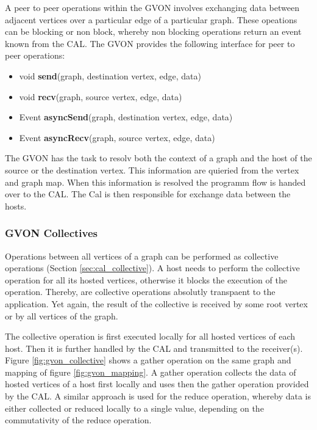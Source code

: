 A peer to peer operations within the GVON involves exchanging data
between adjacent vertices over a particular edge of a particular
graph.  These opeations can be blocking or non block, whereby non
blocking operations return an event known from the CAL.  The GVON
provides the following interface for peer to peer operations:

\begin{itemize}
  \item [] void \textbf{send}(graph, destination vertex, edge, data)
  \item [] void \textbf{recv}(graph, source vertex, edge, data)
  \item [] Event \textbf{asyncSend}(graph, destination vertex, edge, data)
  \item [] Event \textbf{asyncRecv}(graph, source vertex, edge, data)
\end{itemize}

The GVON has the task to resolv both the context of a graph and the
host of the source or the destination vertex. This information are
quieried from the vertex and graph map. When this information is
resolved the programm flow is handed over to the CAL. The Cal is then
responsible for exchange data between the hosts.

\subsubsection*{GVON Collectives}
Operations between all vertices of a graph can be performed as
collective operations (Section \ref{sec:cal_collective}). A host needs
to perform the collective operation for all its hosted vertices,
otherwise it blocks the execution of the operation.  Thereby, are
collective operations absolutly transpaent to the application. Yet
again, the result of the collective is received by some root vertex or
by all vertices of the graph.

The collective operation is first executed locally for all hosted
vertices of each host. Then it is further handled by the CAL and
transmitted to the receiver(s). Figure \ref{fig:gvon_collective} shows
a gather operation on the same graph and mapping of figure
\ref{fig:gvon_mapping}. A gather operation collects the data of hosted
vertices of a host first locally and uses then the gather operation
provided by the CAL. A similar approach is used for the reduce
operation, whereby data is either collected or reduced locally to a
single value, depending on the commutativity of the reduce
operation. 


